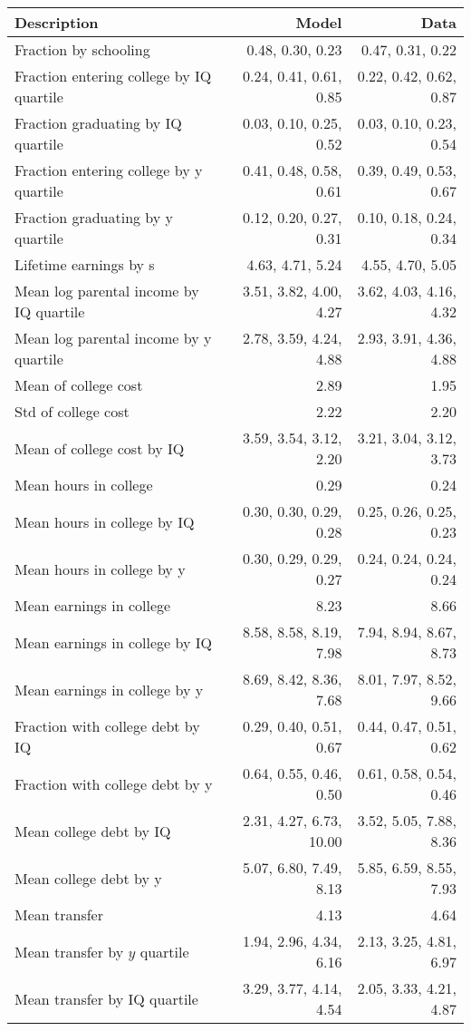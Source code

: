 \begin{tabular}{lrr}
\hline
Description & Model  & Data  \\
\hline
Fraction by schooling & 0.48, 0.30, 0.23  & 0.47, 0.31, 0.22  \\
Fraction entering college by IQ quartile & 0.24, 0.41, 0.61, 0.85  & 0.22, 0.42, 0.62, 0.87  \\
Fraction graduating by IQ quartile & 0.03, 0.10, 0.25, 0.52  & 0.03, 0.10, 0.23, 0.54  \\
Fraction entering college by y quartile & 0.41, 0.48, 0.58, 0.61  & 0.39, 0.49, 0.53, 0.67  \\
Fraction graduating by y quartile & 0.12, 0.20, 0.27, 0.31  & 0.10, 0.18, 0.24, 0.34  \\
Lifetime earnings by s & 4.63, 4.71, 5.24  & 4.55, 4.70, 5.05  \\
Mean log parental income by IQ quartile & 3.51, 3.82, 4.00, 4.27  & 3.62, 4.03, 4.16, 4.32  \\
Mean log parental income by y quartile & 2.78, 3.59, 4.24, 4.88  & 2.93, 3.91, 4.36, 4.88  \\
Mean of college cost & 2.89  & 1.95  \\
Std of college cost & 2.22  & 2.20  \\
Mean of college cost by IQ & 3.59, 3.54, 3.12, 2.20  & 3.21, 3.04, 3.12, 3.73  \\
Mean hours in college & 0.29  & 0.24  \\
Mean hours in college by IQ & 0.30, 0.30, 0.29, 0.28  & 0.25, 0.26, 0.25, 0.23  \\
Mean hours in college by y & 0.30, 0.29, 0.29, 0.27  & 0.24, 0.24, 0.24, 0.24  \\
Mean earnings in college & 8.23  & 8.66  \\
Mean earnings in college by IQ & 8.58, 8.58, 8.19, 7.98  & 7.94, 8.94, 8.67, 8.73  \\
Mean earnings in college by y & 8.69, 8.42, 8.36, 7.68  & 8.01, 7.97, 8.52, 9.66  \\
Fraction with college debt by IQ & 0.29, 0.40, 0.51, 0.67  & 0.44, 0.47, 0.51, 0.62  \\
Fraction with college debt by y & 0.64, 0.55, 0.46, 0.50  & 0.61, 0.58, 0.54, 0.46  \\
Mean college debt by IQ & 2.31, 4.27, 6.73, 10.00  & 3.52, 5.05, 7.88, 8.36  \\
Mean college debt by y & 5.07, 6.80, 7.49, 8.13  & 5.85, 6.59, 8.55, 7.93  \\
Mean transfer & 4.13  & 4.64  \\
Mean transfer by $y$ quartile & 1.94, 2.96, 4.34, 6.16  & 2.13, 3.25, 4.81, 6.97  \\
Mean transfer by IQ quartile & 3.29, 3.77, 4.14, 4.54  & 2.05, 3.33, 4.21, 4.87  \\
\hline
\end{tabular}%
